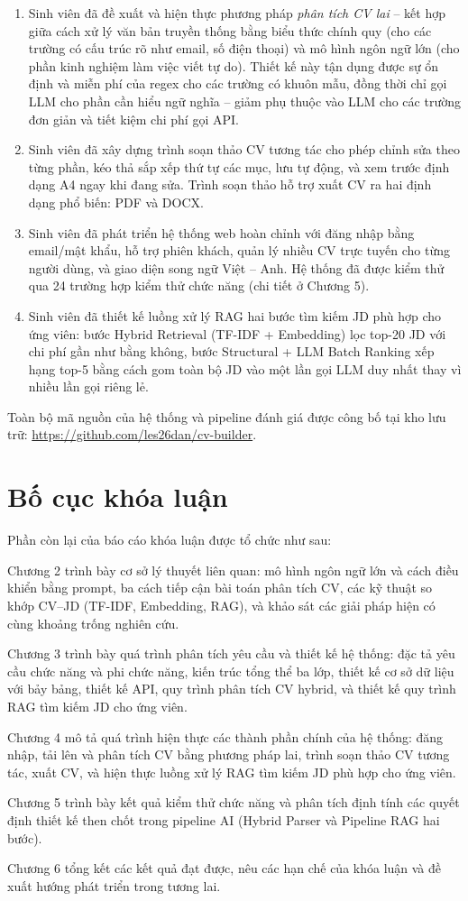 \documentclass[../DoAn.tex]{subfiles}
\begin{document}
\begin{enumerate}
\item Sinh viên đã đề xuất và hiện thực phương pháp \textit{phân tích CV lai} -- kết hợp giữa cách xử lý văn bản truyền thống bằng biểu thức chính quy (cho các trường có cấu trúc rõ như email, số điện thoại) và mô hình ngôn ngữ lớn (cho phần kinh nghiệm làm việc viết tự do). Thiết kế này tận dụng được sự ổn định và miễn phí của regex cho các trường có khuôn mẫu, đồng thời chỉ gọi LLM cho phần cần hiểu ngữ nghĩa -- giảm phụ thuộc vào LLM cho các trường đơn giản và tiết kiệm chi phí gọi API.
\item Sinh viên đã xây dựng trình soạn thảo CV tương tác cho phép chỉnh sửa theo từng phần, kéo thả sắp xếp thứ tự các mục, lưu tự động, và xem trước định dạng A4 ngay khi đang sửa. Trình soạn thảo hỗ trợ xuất CV ra hai định dạng phổ biến: PDF và DOCX.
\item Sinh viên đã phát triển hệ thống web hoàn chỉnh với đăng nhập bằng email/mật khẩu, hỗ trợ phiên khách, quản lý nhiều CV trực tuyến cho từng người dùng, và giao diện song ngữ Việt -- Anh. Hệ thống đã được kiểm thử qua 24 trường hợp kiểm thử chức năng (chi tiết ở Chương 5).
\item Sinh viên đã thiết kế luồng xử lý RAG hai bước tìm kiếm JD phù hợp cho ứng viên: bước Hybrid Retrieval (TF-IDF + Embedding) lọc top-20 JD với chi phí gần như bằng không, bước Structural + LLM Batch Ranking xếp hạng top-5 bằng cách gom toàn bộ JD vào một lần gọi LLM duy nhất thay vì nhiều lần gọi riêng lẻ.
\end{enumerate}

Toàn bộ mã nguồn của hệ thống và pipeline đánh giá được công bố tại kho lưu trữ: \url{https://github.com/les26dan/cv-builder}.

\section{Bố cục khóa luận}

Phần còn lại của báo cáo khóa luận được tổ chức như sau:

Chương 2 trình bày cơ sở lý thuyết liên quan: mô hình ngôn ngữ lớn và cách điều khiển bằng prompt, ba cách tiếp cận bài toán phân tích CV, các kỹ thuật so khớp CV--JD (TF-IDF, Embedding, RAG), và khảo sát các giải pháp hiện có cùng khoảng trống nghiên cứu.

Chương 3 trình bày quá trình phân tích yêu cầu và thiết kế hệ thống: đặc tả yêu cầu chức năng và phi chức năng, kiến trúc tổng thể ba lớp, thiết kế cơ sở dữ liệu với bảy bảng, thiết kế API, quy trình phân tích CV hybrid, và thiết kế quy trình RAG tìm kiếm JD cho ứng viên.

Chương 4 mô tả quá trình hiện thực các thành phần chính của hệ thống: đăng nhập, tải lên và phân tích CV bằng phương pháp lai, trình soạn thảo CV tương tác, xuất CV, và hiện thực luồng xử lý RAG tìm kiếm JD phù hợp cho ứng viên.

Chương 5 trình bày kết quả kiểm thử chức năng và phân tích định tính các quyết định thiết kế then chốt trong pipeline AI (Hybrid Parser và Pipeline RAG hai bước).

Chương 6 tổng kết các kết quả đạt được, nêu các hạn chế của khóa luận và đề xuất hướng phát triển trong tương lai.
\end{document}
